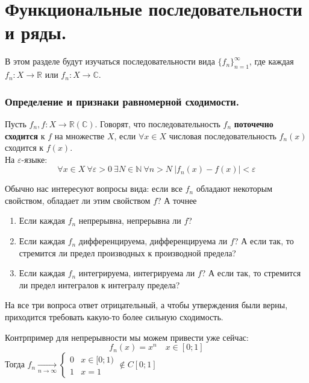 \documentclass{article}
\let\eps\varepsilon
\begin{document}
    \tableofcontents\pagebreak
    \part{Функциональные последовательности и ряды.}
    \begin{remark}
        В этом разделе будут изучаться последовательности вида $\{f_n\}_{n=1}^\infty$, где каждая $f_n\colon X\to\mathbb R$ или $f_n\colon X\to\mathbb C$.
    \end{remark}
    \section{Определение и признаки равномерной сходимости.}
    \begin{definition}
        Пусть $f_n,f\colon X\to\mathbb R(\mathbb C)$. Говорят, что последовательность $f_n$ \textbf{поточечно сходится} к $f$ на множестве $X$, если $\forall x\in X$ числовая последовательность $f_n(x)$ сходится к $f(x)$.\\
        На $\varepsilon$-языке:
        $$
        \forall x\in X~\forall\eps>0~\exists N\in\mathbb N~\forall n>N~|f_n(x)-f(x)|<\eps
        $$
    \end{definition}
    \begin{remark}
        Обычно нас интересуют вопросы вида: если все $f_n$ обладают некоторым свойством, обладает ли этим свойством $f$? А точнее
        \begin{enumerate}
            \item Если каждая $f_n$ непрерывна, непрерывна ли $f$?
            \item Если каждая $f_n$ дифференцируема, дифференцируема ли $f$? А если так, то стремится ли предел производных к производной предела?
            \item Если каждая $f_n$ интегрируема, интегрируема ли $f$? А если так, то стремится ли предел интегралов к интегралу предела?
        \end{enumerate}
        На все три вопроса ответ отрицательный, а чтобы утверждения были верны, приходится требовать какую-то более сильную сходимость.
    \end{remark}
    \begin{example}
        Контрпример для непрерывности мы можем привести уже сейчас:
        $$f_n(x)=x^n\quad x\in[0;1]$$
        Тогда $f_n\underset{n\to\infty}\longrightarrow\begin{cases}
            0 & x\in[0;1)\\
            1 & x=1
        \end{cases}\notin C[0;1]$
    \end{example}
\end{document}
